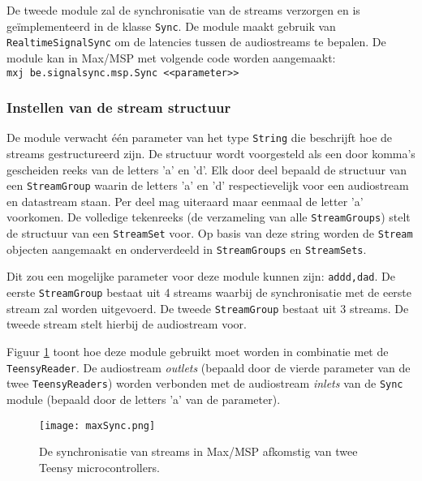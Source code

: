 De tweede module zal de synchronisatie van de streams verzorgen en is geïmplementeerd in de klasse \texttt{Sync}. De module maakt gebruik van \texttt{RealtimeSignalSync} om de latencies tussen de audiostreams te bepalen. De module kan in Max/MSP met volgende code worden aangemaakt: \texttt{mxj\textapprox\  be.signalsync.msp.Sync <<parameter>>}

\subsubsection{Instellen van de stream structuur}

De module verwacht één parameter van het type \texttt{String} die beschrijft hoe de streams gestructureerd zijn. De structuur wordt voorgesteld als een door komma's gescheiden reeks van de letters 'a' en 'd'. Elk door deel bepaald de structuur van een \texttt{StreamGroup} waarin de letters 'a' en 'd' respectievelijk voor een audiostream en datastream staan. Per deel mag uiteraard maar eenmaal de letter 'a' voorkomen. De volledige tekenreeks  (de verzameling van alle \texttt{StreamGroups}) stelt de structuur van een \texttt{StreamSet} voor. Op basis van deze string worden de \texttt{Stream} objecten aangemaakt en onderverdeeld in \texttt{StreamGroups} en \texttt{StreamSets}.

Dit zou een mogelijke parameter voor deze module kunnen zijn: \texttt{addd,dad}. De eerste \texttt{StreamGroup} bestaat uit 4 streams waarbij de synchronisatie met de eerste stream zal worden uitgevoerd. De tweede \texttt{StreamGroup} bestaat uit 3 streams. De tweede stream stelt hierbij de audiostream voor.

Figuur \ref{maxStreamSync} toont hoe deze module gebruikt moet worden in combinatie met de \texttt{TeensyReader}. De audiostream \textit{outlets} (bepaald door de vierde parameter van de twee \texttt{TeensyReaders}) worden verbonden met de audiostream \textit{inlets} van de \texttt{Sync} module (bepaald door de letters 'a' van de parameter).

\begin{figure}[h!]
	\captionsetup{width=0.8\textwidth}
	\caption[Synchronisatie in Max/MSP]{De synchronisatie van streams in Max/MSP afkomstig van twee Teensy microcontrollers.}
	\begin{center}
		\advance\parskip0.3cm
		\texttt{[image: maxSync.png]}
	\end{center}
	\label{maxStreamSync}
\end{figure}

